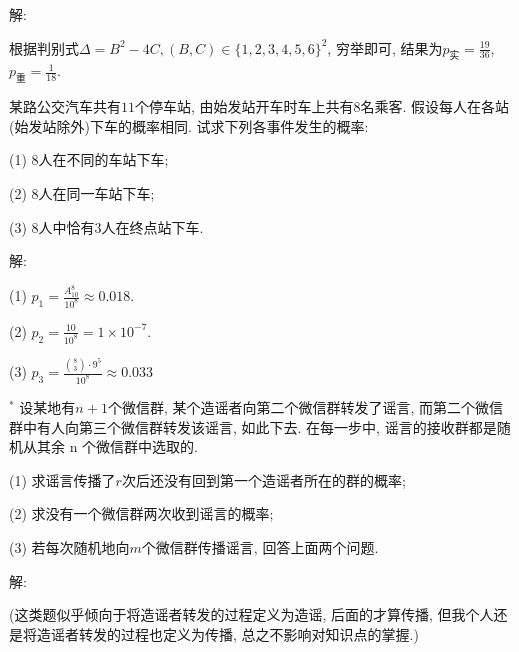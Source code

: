 \documentclass[standard]{ExBook}
\renewenvironment{shaded}{%
  \def\FrameCommand{\fboxsep=\FrameSep \colorbox{shadecolor}}%
  \MakeFramed{\advance\hsize-\width \FrameRestore}%
}{%
  \endMakeFramed
}
\begin{document}
\begin{qitems}
\vspace{\dimexpr2.5cm-5em\relax}

解: 

根据判别式$\Delta=B^2-4C,(B,C)\in\{1,2,3,4,5,6\}^2$, 穷举即可, 结果为$p_{\text{实}}=\frac{19}{36}$, $p_{\text{重}}=\frac{1}{18}$.

\vspace{2.5cm-5em}

    \begin{bbox}
    \begin{shaded}
        \qitem
某路公交汽车共有$11$个停车站, 由始发站开车时车上共有8名乘客. 假设每人在各站(始发站除外)下车的概率相同. 试求下列各事件发生的概率:

(1) 8人在不同的车站下车;

(2) 8人在同一车站下车;

(3) 8人中恰有3人在终点站下车.
    \end{shaded}
    \end{bbox}

\vspace{\dimexpr2.5cm-5em\relax}

解: 

(1) $p_{1}=\frac{A_{10}^{8}}{10^8}\approx0.018$.

(2) $p_{2}=\frac{10}{10^8}=1\times10^{-7}$.

(3) $p_{3}=\frac{\binom{8}{3}\cdot 9^5}{10^8}\approx0.033$

\vspace{2.5cm-5em}

    \begin{bbox}
    \begin{shaded}
        \qitem$^{*}$
设某地有$n + 1$个微信群, 某个造谣者向第二个微信群转发了谣言, 而第二个微信群中有人向第三个微信群转发该谣言, 如此下去. 在每一步中, 谣言的接收群都是随机从其余 n 个微信群中选取的.

(1) 求谣言传播了$r$次后还没有回到第一个造谣者所在的群的概率;

(2) 求没有一个微信群两次收到谣言的概率;

(3) 若每次随机地向$m$个微信群传播谣言, 回答上面两个问题.
    \end{shaded}
    \end{bbox}

\vspace{\dimexpr2.5cm-5em\relax}

解: 

(这类题似乎倾向于将造谣者转发的过程定义为造谣, 后面的才算传播, 但我个人还是将造谣者转发的过程也定义为传播, 总之不影响对知识点的掌握.)


\end{qitems}
\end{document}
